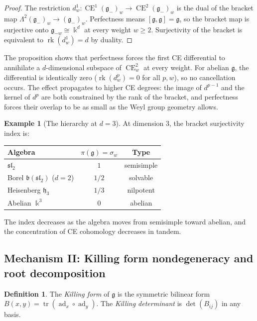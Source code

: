 \documentclass[11pt,reqno]{amsart}
\theoremstyle{plain}
\theoremstyle{definition}
\newtheorem{definition}[theorem]{Definition}
\newtheorem{example}[theorem]{Example}
\theoremstyle{remark}
\DeclareMathOperator{\CE}{CE}
\DeclareMathOperator{\ad}{ad}
\DeclareMathOperator{\tr}{tr}
\DeclareMathOperator{\rk}{rk}
\newcommand{\fg}{\mathfrak{g}}
\newcommand{\fh}{\mathfrak{h}}
\newcommand{\fb}{\mathfrak{b}}
\newcommand{\gminus}{\fg_{-}}
\newcommand{\kk}{\Bbbk}
\begin{document}
\begin{proof}
 The restriction $d^1_w \colon \CE^1(\gminus)_w \to \CE^2(\gminus)_w$ is the
 dual of the bracket map $\Lambda^2(\gminus)_w \to (\gminus)_w$. Perfectness
 means $[\fg, \fg] = \fg$, so the bracket map is surjective onto $\fg_{-w}
 \cong \kk^d$ at every weight $w \ge 2$. Surjectivity of the bracket is
 equivalent to $\rk(d^1_w) = d$ by duality.
\end{proof}

The proposition shows that perfectness forces the first CE differential to
annihilate a $d$-dimensional subspace of $\CE^2_w$ at every weight. For
abelian $\fg$, the differential is identically zero ($\rk(d^p_w) = 0$ for all
$p, w$), so no cancellation occurs. The effect propagates to higher CE
degrees: the image of $d^{p-1}$ and the kernel of $d^p$ are both constrained
by the rank of the bracket, and perfectness forces their overlap to be as
small as the Weyl group geometry allows.

\begin{example}[The hierarchy at $d = 3$]\label{ex:surjectivity-d3}
 At dimension $3$, the bracket surjectivity index is:
 \begin{center}
 \begin{tabular}{lcc}
 \toprule
 Algebra & $\pi(\fg) = \sigma_w$ & Type \\
 \midrule
 $\mathfrak{sl}_2$ & $1$ & semisimple \\
 Borel $\fb(\mathfrak{sl}_2)$ ($d = 2$) & $1/2$ & solvable \\
 Heisenberg $\fh_3$ & $1/3$ & nilpotent \\
 Abelian $\kk^3$ & $0$ & abelian \\
 \bottomrule
 \end{tabular}
 \end{center}
 The index decreases as the algebra moves from semisimple toward abelian,
 and the concentration of CE cohomology decreases in tandem.
\end{example}


\subsection{Mechanism II: Killing form nondegeneracy and root decomposition}
\label{sec:killing}

\begin{definition}\label{def:killing}
 The \emph{Killing form} of $\fg$ is the symmetric bilinear form
 $B(x,y) = \tr(\ad_x \circ \ad_y)$. The \emph{Killing determinant} is
 $\det(B_{ij})$ in any basis.
\end{definition}
\end{document}
